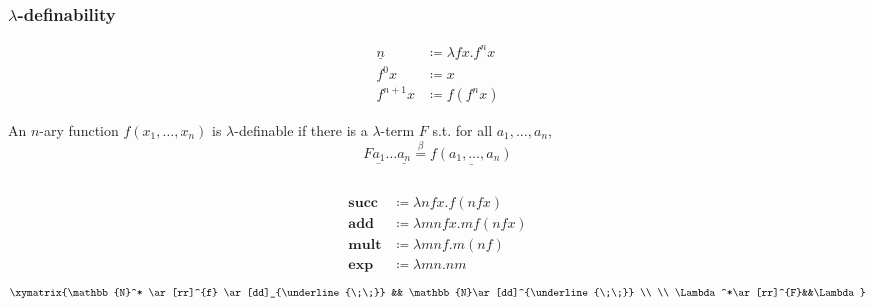\documentclass[UTF8,aspectratio=43,11pt,colorlinks,compress,openany]{beamer}%
\begin{document}
\begin{frame}\frametitle{$\lambda$-definability}
	\setlength\abovedisplayskip{0pt}
	\setlength\belowdisplayskip{0pt}
	\begin{align*}
	\underline{n}&\coloneqq \lambda fx.f^nx\\
	f^0x&\coloneqq x\\
	f^{n+1}x&\coloneqq f(f^nx)
	\end{align*}
	\begin{definition}
		An $n$-ary function $f(x_1,\dots,x_n)$ is $\lambda$-definable if there is a $\lambda$-term $F$ s.t. for all $a_1,\dots,a_n$,
		\[F\underline{a_1}\dots\underline{a_n}\stackrel{\beta}{=}\underline{f(a_1,\dots,a_n)}\]
	\end{definition}
\begin{columns}
	\centering{}
	\begin{align*}
		\mathbf{succ}&\coloneqq \lambda nfx.f(nfx)\\
		\mathbf{add}&\coloneqq \lambda mnfx.mf(nfx)\\
		\mathbf{mult}&\coloneqq \lambda mnf.m(nf)\\
		\mathbf{exp}&\coloneqq \lambda mn.nm
	\end{align*}
\[\xymatrix{\mathbb{N}^*
		\ar[rr]^{f} \ar[dd]_{\underline{\;\;}} && \mathbb{N}\ar[dd]^{\underline{\;\;}}
		\\
		\\
		\Lambda^*\ar[rr]^{F}&&\Lambda}\]
\end{columns}
\end{frame}
\end{document}
